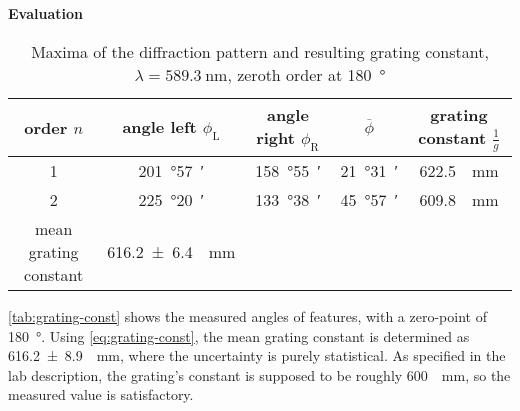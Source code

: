 \textbf{Evaluation}\\
\begin{table}[b!]
	\centering
	\caption[Maxima of the diffraction pattern and resulting grating constant]{Maxima of the diffraction pattern and resulting grating constant, $\lambda=\SI{589.3}{\nm}$, zeroth order at \SI{180}{\degree}}
	\label{tab:grating-const}
	\begin{tabular}{S|SSS|S}
		\toprule
		{order $n$}	&	{angle left $\phi_\text{L}$}	&	{angle right $\phi_\text{R}$}	&	{$\overline{\phi}$}	&	{grating constant $\frac{1}{g}$}\\
			&	\SI{201}{\degree}\SI{57}{\arcminute}	&	\SI{158}{\degree}\SI{55}{\arcminute}	&	\SI{21}{\degree}\SI{31}{\arcminute}	&	\SI{622.5}{\per\mm}	\\
			2	&	\SI{225}{\degree}\SI{20}{\arcminute}	&	\SI{133}{\degree}\SI{38}{\arcminute}	&	\SI{45}{\degree}\SI{57}{\arcminute}	&	\SI{609.8}{\per\mm}	\\
		\midrule
		{mean grating constant}	&	\SI{616.2(64)}{\per\mm}\\
		\bottomrule
	\end{tabular}
\end{table}

\autoref{tab:grating-const} shows the measured angles of features, with a zero-point of \SI{180}{\degree}.
Using \autoref{eq:grating-const}, the mean grating constant is determined as \SI{616.2(89)}{\per\mm}, where the uncertainty is purely statistical.
As specified in the lab description, the grating's constant is supposed to be roughly \SI{600}{\per\mm}, so the measured value is satisfactory.

